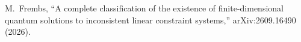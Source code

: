 
M.~Frembs,
``A complete classification of the existence of finite-dimensional quantum
solutions to inconsistent linear constraint systems,''
arXiv:2609.16490 (2026).



%
